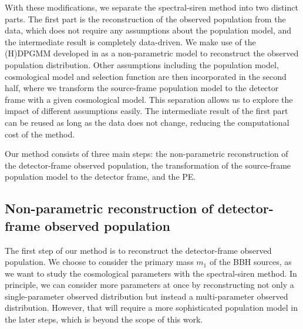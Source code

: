 \documentclass[sn-aps, pdflatex]{sn-jnl}
\begin{document}
With these modifications, we separate the spectral-siren method into two distinct parts.
The first part is the reconstruction of the observed population from the data, which does not require any assumptions about the population model, and the intermediate result is completely data-driven.
We make use of the \ac{(H)DPGMM} developed in \cite{Rinaldi:2021bhm} as a non-parametric model to reconstruct the observed population distribution.
Other assumptions including the population model, cosmological model and selection function are then incorporated in the second half, where we transform the source-frame population model to the detector frame with a given cosmological model.
This separation allows us to explore the impact of different assumptions easily.
The intermediate result of the first part can be reused as long as the data does not change, reducing the computational cost of the method.

Our method consists of three main steps: the non-parametric reconstruction of the detector-frame observed population, the transformation of the source-frame population model to the detector frame, and the \ac{PE}.

\subsection{Non-parametric reconstruction of detector-frame observed population}
\label{sec:reconstruction}

The first step of our method is to reconstruct the detector-frame observed population.
We choose to consider the primary mass $m_1$ of the \ac{BBH} sources, as we want to study the cosmological parameters with the spectral-siren method.
In principle, we can consider more parameters at once by reconstructing not only a single-parameter observed distribution but instead a multi-parameter observed distribution.
However, that will require a more sophisticated population model in the later steps, which is beyond the scope of this work.
\end{document}
